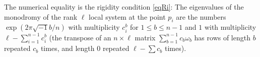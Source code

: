  The numerical equality is the rigidity condition \eqref{eqRi}: The eigenvalues of the monodromy of the rank $\ell$ local system at the point $p_i$ are the numbers $\exp(2\pi\sqrt{-1}b/n)$ with multiplicity $c^b_i$ for $1\leq b\leq n-1$ and $1$ with multiplicity $\ell-\sum_{i=1}^{n-1} c^b_i$ (the transpose of an $n\times \ell$ matrix $\sum_{b=1}^{n-1} c_b\omega_b$ has rows of length $b$ repeated $c_b$ times, and length $0$ repeated $\ell-\sum c_b$ times).

\fi
